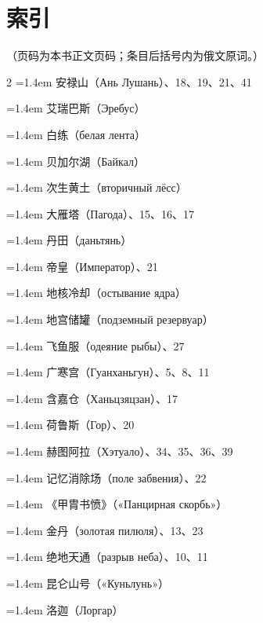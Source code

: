 \clearpage
\chapter*{索\quad 引}

（页码为本书正文页码；条目后括号内为俄文原词。）

\vspace{4mm}
{\footnotesize
\linespread{1.30}\selectfont
\setlength{\columnsep}{16pt}
\begin{multicols}{2}
\noindent
\hangindent=1.4em 安禄山（Ань Лушань）、18、19、21、41

\hangindent=1.4em 艾瑞巴斯（Эребус）

\hangindent=1.4em 白练（белая лента）

\hangindent=1.4em 贝加尔湖（Байкал）

\hangindent=1.4em 次生黄土（вторичный лёсс）

\hangindent=1.4em 大雁塔（Пагода）、15、16、17

\hangindent=1.4em 丹田（даньтянь）

\hangindent=1.4em 帝皇（Император）、21

\hangindent=1.4em 地核冷却（остывание ядра）

\hangindent=1.4em 地宫储罐（подземный резервуар）

\hangindent=1.4em 飞鱼服（одеяние рыбы）、27

\hangindent=1.4em 广寒宫（Гуанханьгун）、5、8、11

\hangindent=1.4em 含嘉仓（Ханьцзяцзан）、17

\hangindent=1.4em 荷鲁斯（Гор）、20

\hangindent=1.4em 赫图阿拉（Хэтуало）、34、35、36、39

\hangindent=1.4em 记忆消除场（поле забвения）、22

\hangindent=1.4em 《甲胄书愤》（«Панцирная скорбь»）

\hangindent=1.4em 金丹（золотая пилюля）、13、23

\hangindent=1.4em 绝地天通（разрыв неба）、10、11

\hangindent=1.4em 昆仑山号（«Куньлунь»）

\hangindent=1.4em 洛迦（Лоргар）


\end{multicols}}
